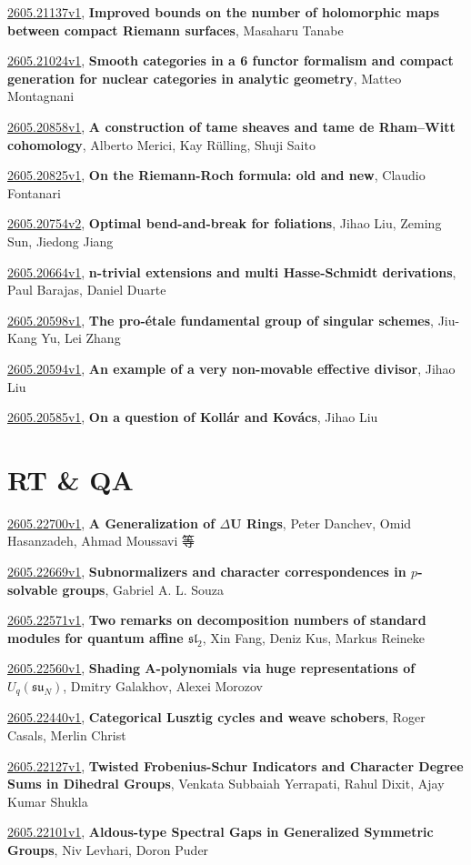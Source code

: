 \documentclass[9pt, a4paper]{article}
\theoremstyle{plain}
\theoremstyle{definition}
\theoremstyle{remark}
\newcommand{\arxiv}[3]{\href{https://arxiv.org/abs/#1}{#1}, \textbf{\textcolor{arxivblue}{#2}}, #3}
\begin{document}
\arxiv{2605.21137v1}{Improved bounds on the number of holomorphic maps between compact Riemann surfaces}{Masaharu Tanabe}

\arxiv{2605.21024v1}{Smooth categories in a 6 functor formalism and compact generation for nuclear categories in analytic geometry}{Matteo Montagnani}

\arxiv{2605.20858v1}{A construction of tame sheaves and tame de Rham--Witt cohomology}{Alberto Merici, Kay Rülling, Shuji Saito}

\arxiv{2605.20825v1}{On the Riemann-Roch formula: old and new}{Claudio Fontanari}

\arxiv{2605.20754v2}{Optimal bend-and-break for foliations}{Jihao Liu, Zeming Sun, Jiedong Jiang}

\arxiv{2605.20664v1}{n-trivial extensions and multi Hasse-Schmidt derivations}{Paul Barajas, Daniel Duarte}

\arxiv{2605.20598v1}{The pro-étale fundamental group of singular schemes}{Jiu-Kang Yu, Lei Zhang}

\arxiv{2605.20594v1}{An example of a very non-movable effective divisor}{Jihao Liu}

\arxiv{2605.20585v1}{On a question of Kollár and Kovács}{Jihao Liu}


\section{RT \& QA}
\arxiv{2605.22700v1}{A Generalization of $Δ$U Rings}{Peter Danchev, Omid Hasanzadeh, Ahmad Moussavi 等}

\arxiv{2605.22669v1}{Subnormalizers and character correspondences in $p$-solvable groups}{Gabriel A. L. Souza}

\arxiv{2605.22571v1}{Two remarks on decomposition numbers of standard modules for quantum affine $\mathfrak{sl}_2$}{Xin Fang, Deniz Kus, Markus Reineke}

\arxiv{2605.22560v1}{Shading A-polynomials via huge representations of $U_q(\mathfrak{su}_N)$}{Dmitry Galakhov, Alexei Morozov}

\arxiv{2605.22440v1}{Categorical Lusztig cycles and weave schobers}{Roger Casals, Merlin Christ}

\arxiv{2605.22127v1}{Twisted Frobenius-Schur Indicators and Character Degree Sums in Dihedral Groups}{Venkata Subbaiah Yerrapati, Rahul Dixit, Ajay Kumar Shukla}

\arxiv{2605.22101v1}{Aldous-type Spectral Gaps in Generalized Symmetric Groups}{Niv Levhari, Doron Puder}
\end{document}
